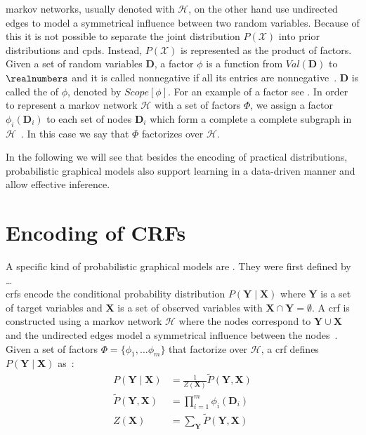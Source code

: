 \Glspl{markov network}, usually denoted with $\mathcal{H}$,  on the other hand use undirected \glspl{edge} to model a symmetrical influence between two \glspl{random variable}.
Because of this it is not possible to separate the \gls{joint distribution} $P(\mathcal{X})$ into \glspl{prior distribution} and \glspl{cpd}.
Instead, $P(\mathcal{X})$ is represented as the product of \glspl{factor}.
Given a set of \glspl{random variable} $\bm{D}$, a \gls{factor} $\phi$ is a function from $Val(\bm{D})$ to $\realnumbers$ and it is called nonnegative if all its entries are nonnegative~\citep{koller2009probabilistic}.
$\bm{D}$ is called the  of $\phi$, denoted by $Scope[\phi]$.
For an example of a factor see .
In order to represent a \gls{markov network} $\mathcal{H}$ with a set of \glspl{factor} $\Phi$, we assign a \gls{factor} $\phi_i(\bm{D}_i)$ to each set of nodes $\bm{D}_i$ which form a complete a complete \gls{subgraph} in $\mathcal{H}$~\citep{koller2009probabilistic}.
In this case we say that $\Phi$ factorizes over $\mathcal{H}$.


In the following we will see that besides the encoding of practical distributions, \glspl{probabilistic graphical model} also support learning in a data-driven manner and allow effective inference.

\section{Encoding of CRFs}\label{sec:definition-crfs}
A specific kind of \glspl{probabilistic graphical model} are .
They were first defined by \citet{lafferty2001conditional} \dots\\

\Glspl{crf} encode the \gls{conditional probability distribution} $P(\bm{Y}\mid\bm{X})$ where $\bm{Y}$ is a set of \glspl{target variable} and $\bm{X}$ is a set of \glspl{observed variable} with $\bm{X}\cap\bm{Y}=\emptyset$.
A \gls{crf} is constructed using a \gls{markov network} $\mathcal{H}$ where the nodes correspond to $\bm{Y}\cup\bm{X}$ and the undirected edges model a symmetrical influence between the nodes~\citep{koller2009probabilistic}.
Given a set of \glspl{factor} $\Phi=\{\phi_1,\dots\phi_m\}$ that factorize over $\mathcal{H}$, a \gls{crf} defines $P(\bm{Y}\mid\bm{X})$ as~\citep{koller2009probabilistic}:
\begin{equation}
  \label{equ:crf}
  \begin{split}
    P(\bm{Y}\mid\bm{X}) & = \frac{1}{Z(\bm{X})}\tilde{P}(\bm{Y},\bm{X}) \\
    \tilde{P}(\bm{Y},\bm{X}) &= \prod_{i=1}^{m}\phi_i(\bm{D}_i) \\
    Z(\bm{X}) & = \sum_{\bm{Y}}\tilde{P}(\bm{Y},\bm{X})
  \end{split}
\end{equation}

